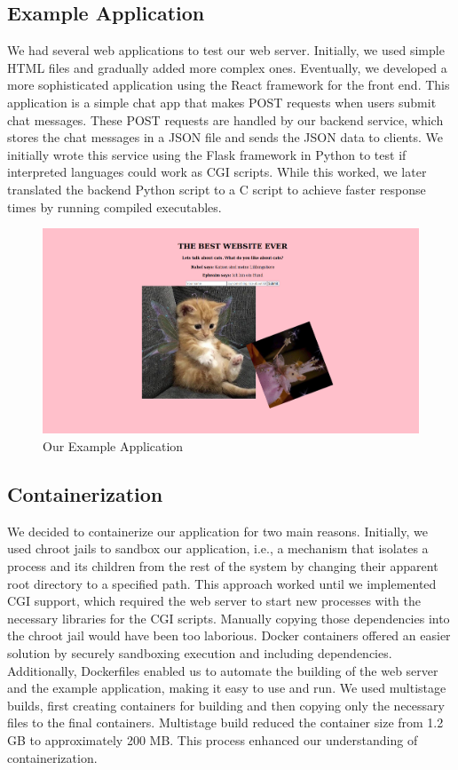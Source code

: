 \subsection*{Example Application}

We had several web applications to test our web server. Initially, we used simple HTML files and gradually added more complex ones. Eventually, we developed a more sophisticated application using the React framework for the front end. This application is a simple chat app that makes POST requests when users submit chat messages. These POST requests are handled by our backend service, which stores the chat messages in a JSON file and sends the JSON data to clients. We initially wrote this service using the Flask framework in Python to test if interpreted languages could work as CGI scripts. While this worked, we later translated the backend Python script to a C script to achieve faster response times by running compiled executables. 

\begin{figure}[h]
	\centering
	\includegraphics[width=\textwidth]{figures/06_ephi_app.png} %
    \caption{Our Example Application}
\end{figure}

\subsection*{Containerization}
We decided to containerize our application for two main reasons. Initially, we used chroot jails to sandbox our application, i.e., a mechanism that isolates a process and its children from the rest of the system by changing their apparent root directory to a specified path. This approach worked until we implemented CGI support, which required the web server to start new processes with the necessary libraries for the CGI scripts. Manually copying those dependencies into the chroot jail would have been too laborious. Docker containers offered an easier solution by securely sandboxing execution and including dependencies. Additionally, Dockerfiles enabled us to automate the building of the web server and the example application, making it easy to use and run. We used multistage builds, first creating containers for building and then copying only the necessary files to the final containers. Multistage build reduced the container size from 1.2 GB to approximately 200 MB. This process enhanced our understanding of containerization.
